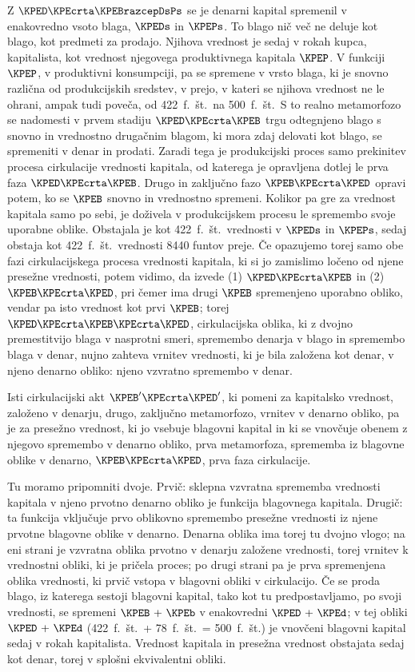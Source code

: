 \documentclass[kapital_02.tex]{subfiles}
\begin{document}
Z \(\KPED\KPEcrta\KPEBrazcepDsPs\) se je denarni kapital spremenil v enakovredno vsoto blaga, \(\KPEDs\) in \(\KPEPs\). To blago nič več ne deluje kot blago, kot predmeti za prodajo. Njihova vrednost je sedaj \KPEstran v rokah kupca, kapitalista, kot vrednost njegovega produktivnega kapitala \(\KPEP\). V funkciji \(\KPEP\), v produktivni konsumpciji, pa se spremene v vrsto blaga, ki je snovno različna od produkcijskih sredstev, v prejo, v kateri se njihova vrednost ne le ohrani, ampak tudi poveča, od 422\ f.\ št.\ na 500\ f.\ št.\ S to realno metamorfozo se nadomesti v prvem stadiju \(\KPED\KPEcrta\KPEB\) trgu odtegnjeno blago s snovno in vrednostno drugačnim blagom, ki mora zdaj delovati kot blago, se spremeniti v denar in prodati. Zaradi tega je produkcijski proces samo prekinitev procesa cirkulacije vrednosti kapitala, od katerega je opravljena dotlej le prva faza \(\KPED\KPEcrta\KPEB\). Drugo in zaključno fazo \(\KPEB\KPEcrta\KPED\) opravi potem, ko se \(\KPEB\) snovno in vrednostno spremeni. Kolikor pa gre za vrednost kapitala samo po sebi, je doživela v produkcijskem procesu le spremembo svoje uporabne oblike. Obstajala je kot 422\ f.\ št.\ vrednosti v \(\KPEDs\) in \(\KPEPs\), sedaj obstaja kot 422\ f.\ št.\ vrednosti 8440 funtov preje. Če opazujemo torej samo obe fazi cirkulacijskega procesa vrednosti kapitala, ki si jo zamislimo ločeno od njene presežne vrednosti, potem vidimo, da izvede (1) \(\KPED\KPEcrta\KPEB\) in (2) \(\KPEB\KPEcrta\KPED\), pri čemer ima drugi \(\KPEB\) spremenjeno uporabno obliko, vendar pa isto vrednost kot prvi \(\KPEB\); torej \(\KPED\KPEcrta\KPEB\KPEcrta\KPED\), cirkulacijska oblika, ki z dvojno premestitvijo blaga v nasprotni smeri, spremembo denarja v blago in spremembo blaga v denar, nujno zahteva vrnitev vrednosti, ki je bila založena kot denar, v njeno denarno obliko: njeno vzvratno spremembo v denar.

Isti cirkulacijski akt \(\KPEB'\KPEcrta\KPED'\), ki pomeni za kapitalsko vrednost, založeno v denarju, drugo, zaključno metamorfozo, vrnitev v denarno obliko, pa je za presežno vrednost, ki jo vsebuje blagovni kapital in ki se vnovčuje obenem z njegovo spremembo v denarno obliko, prva metamorfoza, sprememba iz blagovne oblike v denarno, \(\KPEB\KPEcrta\KPED\), prva faza cirkulacije.

Tu moramo pripomniti dvoje. Prvič: sklepna vzvratna sprememba vrednosti kapitala v njeno prvotno denarno obliko je funkcija blagovnega kapitala. Drugič: ta funkcija vključuje prvo oblikovno spremembo presežne vrednosti iz njene prvotne blagovne oblike v denarno. Denarna oblika ima \KPEstran torej tu dvojno vlogo; na eni strani je vzvratna oblika prvotno v denarju založene vrednosti, torej vrnitev k vrednostni obliki, ki je pričela proces; po drugi strani pa je prva spremenjena oblika vrednosti, ki prvič vstopa v blagovni obliki v cirkulacijo. Če se proda blago, iz katerega sestoji blagovni kapital, tako kot tu predpostavljamo, po svoji vrednosti, se spremeni \(\KPEB \textrm{ + } \KPEb\) v enakovredni \(\KPED \textrm{ + } \KPEd\); v tej obliki \(\KPED \textrm{ + } \KPEd\) (422\ f.\ št.\ + 78\ f.\ št.\ = 500\ f.\ št.) je vnovčeni blagovni kapital sedaj v rokah kapitalista. Vrednost kapitala in presežna vrednost obstajata sedaj kot denar, torej v splošni ekvivalentni obliki.
\end{document}
